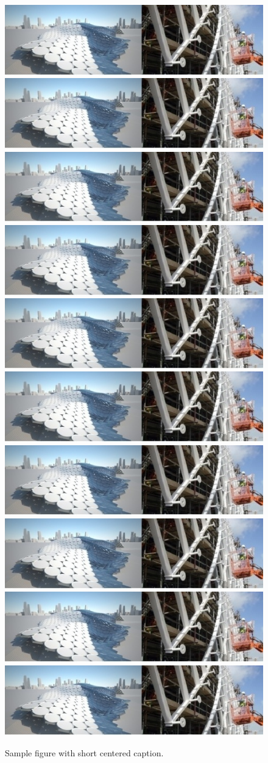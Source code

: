 \documentclass[twoside]{article}
\begin{document}
\begin{figure}[p]
	\centering
	\includegraphics[width=.24\textwidth]{images/image0}
	\includegraphics[width=.24\textwidth]{images/image0}
	\includegraphics[width=.24\textwidth]{images/image0}
	\includegraphics[width=.24\textwidth]{images/image0}
	\includegraphics[width=.30\textwidth]{images/image0}
	\includegraphics[width=.30\textwidth]{images/image0}
	\includegraphics[width=.30\textwidth]{images/image0}
	\includegraphics[width=.40\textwidth]{images/image0}
	\includegraphics[width=.40\textwidth]{images/image0}
	\includegraphics[width=.50\textwidth]{images/image0}
	\caption{Sample figure with short centered caption.}
\end{figure}
\end{document}
